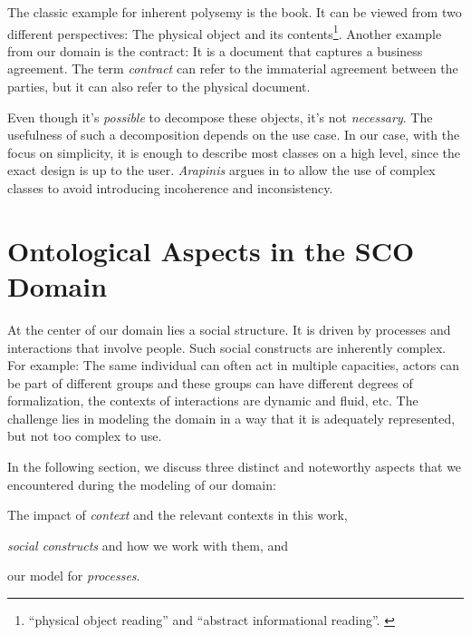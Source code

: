 \documentclass[a4paper, DIV=13, BCOR=0cm]{scrbook}
\begin{document}
The classic example for inherent polysemy is the book. It can be viewed from two different perspectives: The physical object and its contents\footnote{\enquote{physical object reading} and \enquote{abstract informational reading}. \cite[Section 2.1]{arapinis2015plea}}. Another example from our domain is the contract: It is a document that captures a business agreement. The term \textit{contract} can refer to the immaterial agreement between the parties, but it can also refer to the physical document.

Even though it's \textit{possible} to decompose these objects, it's not \textit{necessary}. The usefulness of such a decomposition depends on the use case. In our case, with the focus on simplicity, it is enough to describe most classes on a high level, since the exact design is up to the user. \textit{Arapinis} argues in \cite{arapinis2015plea} to allow the use of complex classes to avoid introducing incoherence and inconsistency.

\chapter[Ontological Aspects in the SCO Domain \\\textcolor{gray}{
	{\footnotesize \textsl{Discusses the three major concepts and their implementation in the context of related work.}}
}]{Ontological Aspects in the SCO Domain}
\label{domain-aspects}
At the center of our domain lies a social structure. It is driven by processes and interactions that involve people. Such social constructs are inherently complex. For example: The same individual can often act in multiple capacities, actors can be part of different groups and these groups can have different degrees of formalization, the contexts of interactions are dynamic and fluid, etc. The challenge lies in modeling the domain in a way that it is adequately represented, but not too complex to use.

In the following section, we discuss three distinct and noteworthy aspects that we encountered during the modeling of our domain:
\begin{inparablank}
	\item The impact of \textit{context} and the relevant contexts in this work,
	\item \textit{social constructs} and how we work with them, and
	\item our model for \textit{processes}.
\end{inparablank}
\end{document}

